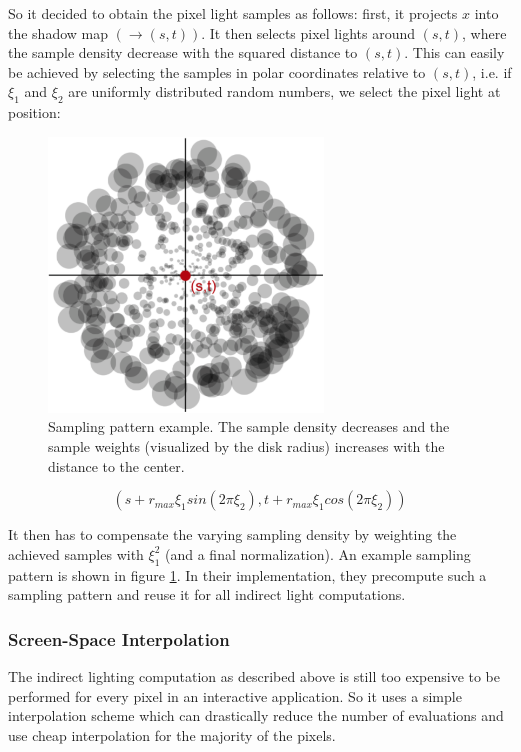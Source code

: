 So it decided to obtain the pixel light samples as follows: first, it projects $x$ into the shadow map $(\to (s,t))$. It then selects pixel lights around $(s,t)$, where the sample density decrease with the squared distance to $(s,t)$. This can easily be achieved by selecting the samples in polar coordinates relative to $(s,t)$, i.e. if $\xi_1$ and $\xi_2$ are uniformly distributed random numbers, we select the pixel light at position:

\begin{figure}
\sidecaption
	\includegraphics[width=0.65\textwidth]{graphics/ir/ir-2-3}
	\caption{Sampling pattern example. The sample density decreases and the sample weights (visualized by the disk radius) increases with the distance to the center.}
	\label{f:rsm-3}
\end{figure} 


\begin{equation*}
	(s+r_{max}\xi_1 sin(2\pi \xi_2),t+r_{max}\xi_1cos(2\pi\xi_2))
\end{equation*}

It then has to compensate the varying sampling density by weighting the achieved samples with $\xi_1^{2}$ (and a final normalization). An example sampling pattern is shown in figure \ref{f:rsm-3}. In their implementation, they precompute such a sampling pattern and reuse it for all indirect light computations.




\subsubsection{Screen-Space Interpolation}
The indirect lighting computation as described above is still too expensive to be performed for every pixel in an interactive application. So it uses a simple interpolation scheme which can drastically reduce the number of evaluations and use cheap interpolation for the majority of the pixels.

